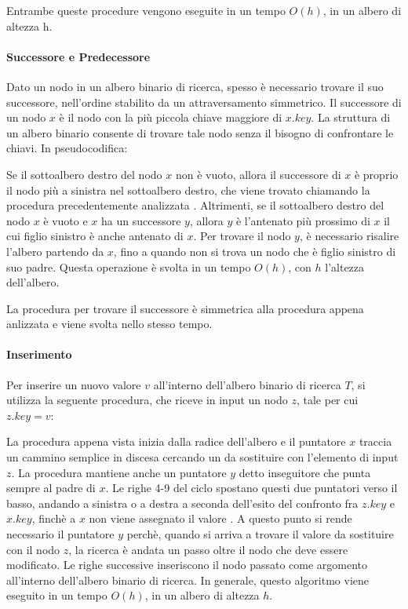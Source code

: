

Entrambe queste procedure vengono eseguite in un tempo \(O(h)\), in un albero di altezza h. 

\paragraph{Successore e Predecessore}
Dato un nodo in un albero binario di ricerca, spesso è necessario trovare il suo successore, nell'ordine stabilito da un attraversamento simmetrico. Il successore di un nodo \(x\) è il nodo con la più piccola chiave maggiore di \(x.key\). La struttura di un albero binario consente di trovare tale nodo senza il bisogno di confrontare le chiavi. In pseudocodifica:



Se il sottoalbero destro del nodo \(x\) non è vuoto, allora il successore di \(x\) è proprio il nodo più a sinistra nel sottoalbero destro, che viene trovato chiamando la procedura precedentemente analizzata . Altrimenti, se il sottoalbero destro del nodo \(x\) è vuoto e \(x\) ha un successore \(y\), allora \(y\) è l'antenato più prossimo di \(x\) il cui figlio sinistro è anche antenato di \(x\). Per trovare il nodo \(y\), è necessario risalire l'albero partendo da \(x\), fino a quando non si trova un nodo che è figlio sinistro di suo padre. Questa operazione è svolta in un tempo \(O(h)\), con \(h\) l'altezza dell'albero. 

La procedura per trovare il successore è simmetrica alla procedura appena anlizzata e viene svolta nello stesso tempo. 

\paragraph{Inserimento}
Per inserire un nuovo valore \(v\) all'interno dell'albero binario di ricerca \(T\), si utilizza la seguente procedura, che riceve in input un nodo \(z\), tale per cui \(z.key = v\):



La procedura appena vista inizia dalla radice dell'albero e il puntatore \(x\) traccia un cammino semplice in discesa cercando un  da sostituire con l'elemento di input \(z\). La procedura mantiene anche un puntatore \(y\) detto inseguitore che punta sempre al padre di \(x\). Le righe 4-9 del ciclo  spostano questi due puntatori verso il basso, andando a sinistra o a destra a seconda dell'esito del confronto fra \({z.key}\) e \(x.key\), finchè a \(x\) non viene assegnato il valore . A questo punto si rende necessario il puntatore \(y\) perchè, quando si arriva a trovare il valore  da sostituire con il nodo \(z\), la ricerca è andata un passo oltre il nodo che deve essere modificato. Le righe successive inseriscono il nodo passato come argomento all'interno dell'albero binario di ricerca. In generale, questo algoritmo viene eseguito in un tempo \(O(h)\), in un albero di altezza \(h\).

